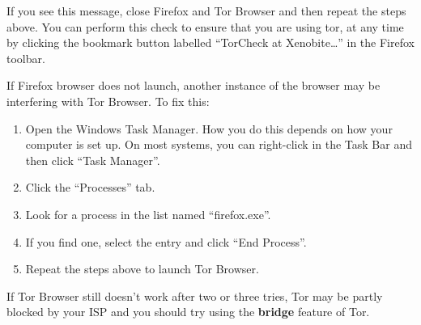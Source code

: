 If you see this message, close Firefox and Tor Browser and then repeat
the steps above. You can perform this check to ensure that you are using
tor, at any time by clicking the bookmark button labelled ``TorCheck at
Xenobite\ldots{}'' in the Firefox toolbar.

If Firefox browser does not launch, another instance of the browser may
be interfering with Tor Browser. To fix this:

\begin{enumerate}[1.]
\item
  Open the Windows Task Manager. How you do this depends on how your
  computer is set up. On most systems, you can right-click in the Task
  Bar and then click ``Task Manager''.
\item
  Click the ``Processes'' tab.
\item
  Look for a process in the list named ``firefox.exe''.
\item
  If you find one, select the entry and click ``End Process''.
\item
  Repeat the steps above to launch Tor Browser.
\end{enumerate}
If Tor Browser still doesn't work after two or three tries, Tor may be
partly blocked by your ISP and you should try using the \textbf{bridge}
feature of Tor.
